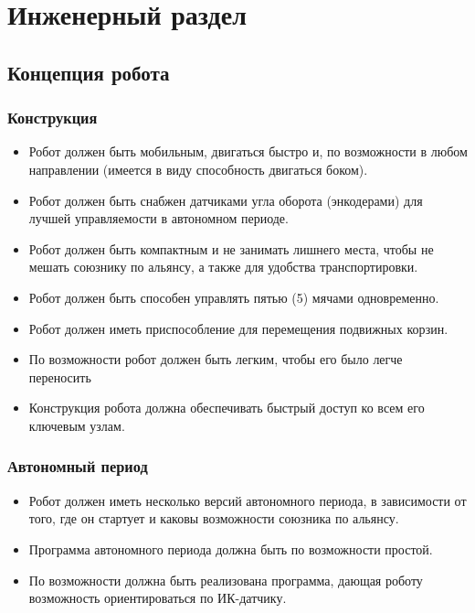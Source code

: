 
\section{Инженерный раздел}
\subsection{Концепция робота}
\subsubsection{Конструкция}
\begin{itemize}
	\item Робот должен быть мобильным, двигаться быстро и, по возможности в любом направлении (имеется в виду способность двигаться боком).
	\item Робот должен быть снабжен датчиками угла оборота (энкодерами) для лучшей управляемости в автономном периоде.
	\item Робот должен быть компактным и не занимать лишнего места, чтобы не мешать союзнику по альянсу, а также для удобства транспортировки.
	\item Робот должен быть способен управлять пятью (5) мячами одновременно.
	\item Робот должен иметь приспособление для перемещения подвижных корзин.
	\item По возможности робот должен быть легким, чтобы его было легче переносить
	\item Конструкция робота должна обеспечивать быстрый доступ ко всем его ключевым узлам.
\end{itemize}
\subsubsection{Автономный период}
\begin{itemize}
	\item Робот должен иметь несколько версий автономного периода, в зависимости от того, где он стартует и каковы возможности союзника по альянсу.
	\item Программа автономного периода должна быть по возможности простой.
	\item По возможности должна быть реализована программа, дающая роботу возможность ориентироваться по ИК-датчику.
\end{itemize}
